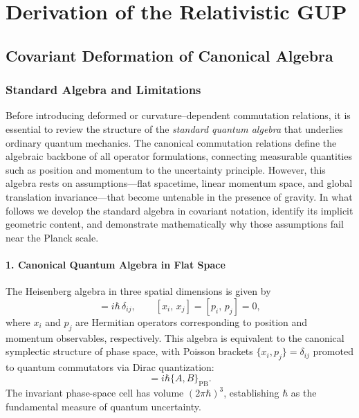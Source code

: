\documentclass[11pt,oneside]{book}
\numberwithin{equation}{chapter}
\begin{document}
\part{Derivation of the Relativistic GUP}

\chapter{Covariant Deformation of Canonical Algebra}
\section{Standard Algebra and Limitations}

Before introducing deformed or curvature–dependent commutation relations, it is essential to review the structure of the \emph{standard quantum algebra} that underlies ordinary quantum mechanics.  
The canonical commutation relations define the algebraic backbone of all operator formulations, connecting measurable quantities such as position and momentum to the uncertainty principle.  
However, this algebra rests on assumptions—flat spacetime, linear momentum space, and global translation invariance—that become untenable in the presence of gravity.  
In what follows we develop the standard algebra in covariant notation, identify its implicit geometric content, and demonstrate mathematically why those assumptions fail near the Planck scale.

\subsection*{1. Canonical Quantum Algebra in Flat Space}

The Heisenberg algebra in three spatial dimensions is given by
\begin{equation}
[x_i,\,p_j] = i\hbar\,\delta_{ij}, \qquad
[x_i,\,x_j]=[p_i,\,p_j]=0,
\end{equation}
where $x_i$ and $p_j$ are Hermitian operators corresponding to position and momentum observables, respectively.  
This algebra is equivalent to the canonical symplectic structure of phase space, with Poisson brackets $\{x_i,p_j\}=\delta_{ij}$ promoted to quantum commutators via Dirac quantization:
\begin{equation}
[A,B] = i\hbar\{A,B\}_{\text{PB}}.
\end{equation}
The invariant phase-space cell has volume $(2\pi\hbar)^3$, establishing $\hbar$ as the fundamental measure of quantum uncertainty.
\end{document}
